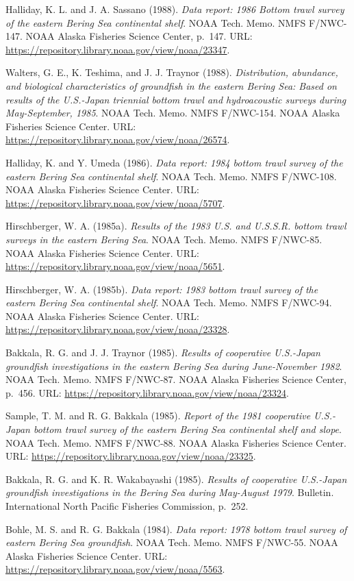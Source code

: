 \documentclass[
  letterpaper,
  oneside,
  open=any]{scrbook}
\begin{document}
Halliday, K. L. and J. A. Sassano (1988). \emph{Data report: 1986 Bottom
trawl survey of the eastern Bering Sea continental shelf}. NOAA Tech.
Memo. NMFS F/NWC-147. NOAA Alaska Fisheries Science Center, p.~147. URL:
\url{https://repository.library.noaa.gov/view/noaa/23347}.

Walters, G. E., K. Teshima, and J. J. Traynor (1988).
\emph{Distribution, abundance, and biological characteristics of
groundfish in the eastern Bering Sea: Based on results of the U.S.-Japan
triennial bottom trawl and hydroacoustic surveys during May-September,
1985}. NOAA Tech. Memo. NMFS F/NWC-154. NOAA Alaska Fisheries Science
Center. URL: \url{https://repository.library.noaa.gov/view/noaa/26574}.

Halliday, K. and Y. Umeda (1986). \emph{Data report: 1984 bottom trawl
survey of the eastern Bering Sea continental shelf}. NOAA Tech. Memo.
NMFS F/NWC-108. NOAA Alaska Fisheries Science Center. URL:
\url{https://repository.library.noaa.gov/view/noaa/5707}.

Hirschberger, W. A. (1985a). \emph{Results of the 1983 U.S. and U.S.S.R.
bottom trawl surveys in the eastern Bering Sea}. NOAA Tech. Memo. NMFS
F/NWC-85. NOAA Alaska Fisheries Science Center. URL:
\url{https://repository.library.noaa.gov/view/noaa/5651}.

Hirschberger, W. A. (1985b). \emph{Data report: 1983 bottom trawl survey
of the eastern Bering Sea continental shelf}. NOAA Tech. Memo. NMFS
F/NWC-94. NOAA Alaska Fisheries Science Center. URL:
\url{https://repository.library.noaa.gov/view/noaa/23328}.

Bakkala, R. G. and J. J. Traynor (1985). \emph{Results of cooperative
U.S.-Japan groundfish investigations in the eastern Bering Sea during
June-November 1982}. NOAA Tech. Memo. NMFS F/NWC-87. NOAA Alaska
Fisheries Science Center, p.~456. URL:
\url{https://repository.library.noaa.gov/view/noaa/23324}.

Sample, T. M. and R. G. Bakkala (1985). \emph{Report of the 1981
cooperative U.S.-Japan bottom trawl survey of the eastern Bering Sea
continental shelf and slope}. NOAA Tech. Memo. NMFS F/NWC-88. NOAA
Alaska Fisheries Science Center. URL:
\url{https://repository.library.noaa.gov/view/noaa/23325}.

Bakkala, R. G. and K. R. Wakabayashi (1985). \emph{Results of
cooperative U.S.-Japan groundfish investigations in the Bering Sea
during May-August 1979}. Bulletin. International North Pacific Fisheries
Commission, p.~252.

Bohle, M. S. and R. G. Bakkala (1984). \emph{Data report: 1978 bottom
trawl survey of eastern Bering Sea groundfish}. NOAA Tech. Memo. NMFS
F/NWC-55. NOAA Alaska Fisheries Science Center. URL:
\url{https://repository.library.noaa.gov/view/noaa/5563}.
\end{document}

